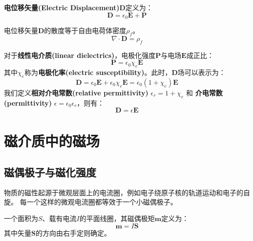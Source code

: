 \documentclass[fontset=none]{ctexart}
\begin{document}
\begin{definition}[电位移矢量]
    \textbf{电位移矢量(Electric Displacement)}$\bm{D}$定义为：
    \begin{equation}
        \bm{D} = \epsilon_0 \bm{E} + \bm{P}
    \end{equation}
\end{definition}
\begin{law}[介质中的高斯定律]
    电位移矢量$\bm{D}$的散度等于自由电荷体密度$\rho_f$。
    \begin{equation}
        \nabla \cdot \bm{D} = \rho_f
    \end{equation}
\end{law}

对于\textbf{线性电介质(linear dielectrics)}，电极化强度$\bm{P}$与电场$\bm{E}$成正比：
\begin{equation}
    \bm{P} = \epsilon_0 \chi_e \bm{E}
\end{equation}
其中$\chi_e$称为\textbf{电极化率(electric susceptibility)}。此时，$\bm{D}$场可以表示为：
\begin{equation}
    \bm{D} = \epsilon_0 \bm{E} + \epsilon_0 \chi_e \bm{E} = \epsilon_0 (1 + \chi_e) \bm{E}
\end{equation}
我们定义\textbf{相对介电常数(relative permittivity)} $\epsilon_r = 1+\chi_e$ 
和 \textbf{介电常数(permittivity)} $\epsilon = \epsilon_0 \epsilon_r$，则有：
\begin{equation}
    \bm{D} = \epsilon \bm{E}
\end{equation}

\section{磁介质中的磁场}

\subsection{磁偶极子与磁化强度}
物质的磁性起源于微观层面上的电流圈，例如电子绕原子核的轨道运动和电子的自旋。
每一个这样的微观电流圈都等效于一个小磁偶极子。

\begin{definition}[磁偶极矩]
    一个面积为$S$、载有电流$I$的平面线圈，其磁偶极矩$\bm{m}$定义为：
    \begin{equation}
        \bm{m} = I \bm{S}
    \end{equation}
    其中矢量$\bm{S}$的方向由右手定则确定。
\end{definition}
\end{document}
